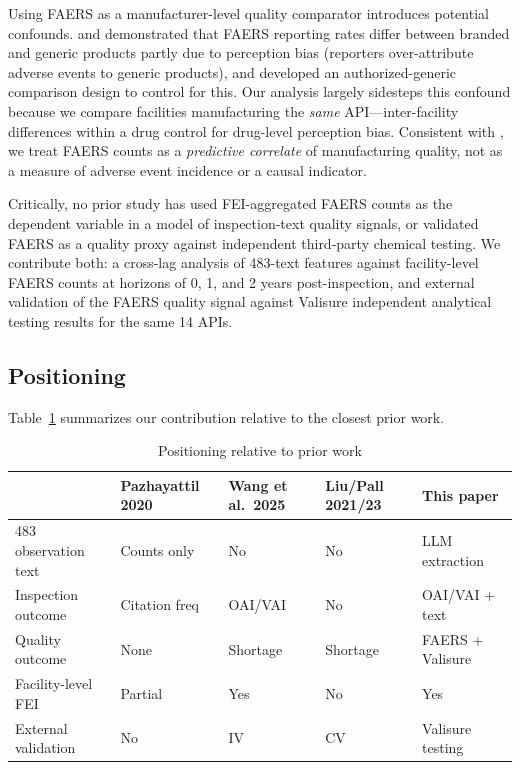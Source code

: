 Using FAERS as a manufacturer-level quality comparator introduces potential
confounds.
\citet{Rahman2017FAERS} and \citet{Alatawi2018} demonstrated that FAERS
reporting rates differ between branded and generic products partly due to
perception bias (reporters over-attribute adverse events to generic products),
and developed an authorized-generic comparison design to control for this.
Our analysis largely sidesteps this confound because we compare facilities
manufacturing the \emph{same} API---inter-facility differences within a drug
control for drug-level perception bias.
Consistent with \citet{Potter2025}, we treat FAERS counts as a
\emph{predictive correlate} of manufacturing quality, not as a measure of
adverse event incidence or a causal indicator.

Critically, no prior study has used FEI-aggregated FAERS counts as the
dependent variable in a model of inspection-text quality signals, or validated
FAERS as a quality proxy against independent third-party chemical testing.
We contribute both: a cross-lag analysis of 483-text features against
facility-level FAERS counts at horizons of 0, 1, and 2 years post-inspection,
and external validation of the FAERS quality signal against Valisure
independent analytical testing results for the same 14 APIs.

\subsection{Positioning}

Table~\ref{tab:positioning} summarizes our contribution relative to the closest
prior work.

\begin{table}[h!]
\centering
\small
\caption{Positioning relative to prior work}
\label{tab:positioning}
\begin{tabular}{p{3.5cm} p{2.2cm} p{2.2cm} p{2.2cm} p{2.5cm}}
\toprule
& \textbf{Pazhayattil 2020} & \textbf{Wang et al.\ 2025} & \textbf{Liu/Pall 2021/23} & \textbf{This paper} \\
\midrule
483 observation text  & Counts only   & No  & No  & LLM extraction \\
Inspection outcome    & Citation freq & OAI/VAI  & No  & OAI/VAI + text \\
Quality outcome       & None          & Shortage & Shortage & FAERS + Valisure \\
Facility-level FEI    & Partial       & Yes      & No       & Yes \\
External validation   & No            & IV       & CV       & Valisure testing \\
\bottomrule
\end{tabular}
\end{table}
